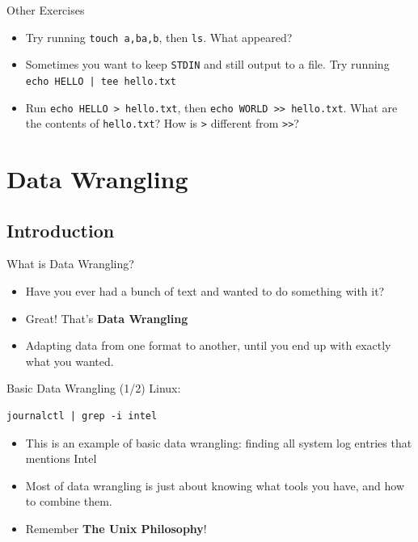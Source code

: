 \documentclass[12pt]{beamer}
\begin{document}
\begin{frame}{Other Exercises}
  \begin{itemize}
    \item Try running \texttt{touch {a,b}{a,b}}, then \texttt{ls}. What appeared?
    \item Sometimes you want to keep \texttt{STDIN} and still output to a file. Try running \texttt{echo HELLO | tee hello.txt}
    \item Run \texttt{echo HELLO > hello.txt}, then \texttt{echo WORLD >> hello.txt}. What are the contents of \texttt{hello.txt}? How is \texttt{>} different from \texttt{>>}?
  \end{itemize}
\end{frame}

\section{Data Wrangling}
\subsection{Introduction}
\begin{frame}{What is Data Wrangling?}
  \begin{itemize}
    \item Have you ever had a bunch of text and wanted to do something with it?
    \item Great! That's \textbf{Data Wrangling}
    \item Adapting data from one format to another, until you end up with exactly what you wanted.
  \end{itemize}
\end{frame}

\begin{frame}[fragile]{Basic Data Wrangling (1/2)}
  Linux:
  \begin{verbatim}
journalctl | grep -i intel
  \end{verbatim}
  \begin{itemize}
    \item This is an example of basic data wrangling: finding all system log entries that mentions Intel
    \item Most of data wrangling is just about knowing what tools you have, and how to combine them.
    \item Remember \textbf{The Unix Philosophy}!
  \end{itemize}
\end{frame}
\end{document}
